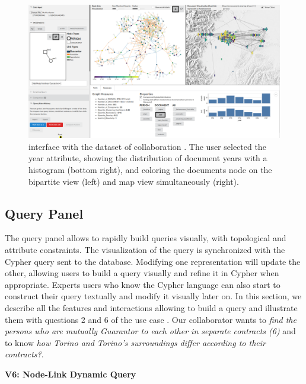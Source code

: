 \begin{figure}
 \centering
    \includegraphics[trim={16cm 0 0 0},clip,width=\textwidth]{static/figures/ComBiNet/Piemont_timeSelected.png}
    \caption{\name interface with the dataset of collaboration \pascal. The user selected the year attribute, showing the distribution of document years with a histogram (bottom right), and coloring the documents node on the bipartite view (left) and map view simultaneously (right).}\label{fig:combinet-time-selected}
\end{figure}

\subsection{Query Panel}

The query panel allows to rapidly build queries visually, with topological and attribute constraints.
The visualization of the query is synchronized with the Cypher query sent to the database.
Modifying one representation will update the other, allowing users to build a query visually and refine it in Cypher when appropriate.
Experts users who know the Cypher language can also start to construct their query textually and modify it visually later on.
In this section, we describe all the features and interactions allowing \name to build a query and illustrate them with questions 2 and 6 of the use case \pascal.
Our collaborator wants to \textit{find the persons who are mutually Guarantor to each other in separate contracts (6)} and to know \textit{how Torino and Torino's surroundings differ according to their contracts?}.


\noindent\textbf{V6: Node-Link Dynamic Query}

